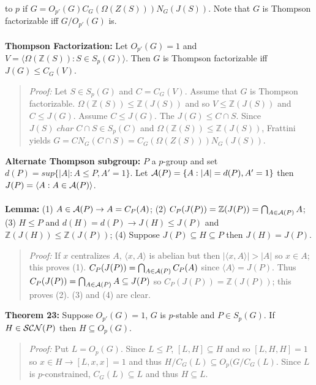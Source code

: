 to $p$ if $G=O_{p'}(G) C_G( \Omega(Z(S))) N_G(J(S))$.  
Note that $G$ is Thompson factorizable iff $G/O_{p'}(G)$ is.
\\
\\
{\bf Thompson Factorization:} 
Let $O_{p'}(G)=1$ and $V= \langle \Omega({\mathbb Z}(S)): S \in S_p(G) \rangle $.
Then $G$ is Thompson factorizable iff $J(G) \le C_G(V)$.
\begin{quote}
\emph{Proof:}  
Let $S \in S_p(G)$ and $C= C_G(V)$.  Assume that $G$ is Thompson factorizable.
$\Omega({\mathbb Z}(S)) \le {\mathbb Z}(J(S))$ and so $V \le {\mathbb Z}(J(S))$ and
$C \le J(G)$.
Assume $C \le J(G)$.  The $J(G) \le C \cap S$.  Since $J(S) \; char \; C \cap S \in S_p(C)$
and
$\Omega({\mathbb Z}(S)) \le {\mathbb Z}(J(S))$, Frattini yields
$G= C N_G(C \cap S) =
C_G( \Omega(Z(S))) N_G(J(S))$.
\end{quote}
{\bf Alternate Thompson subgroup:} 
$P$ a $p$-group and set $d(P)= sup\{ |A| : A \le P, A'=1 \}$.  Let
${\cal A}(P)= \{ A: |A|=d(P), A'=1 \}$ then $J(P)= \langle A : A \in {\cal A}(P) \rangle $.
\\
\\
{\bf Lemma:}
(1) $A \in {\cal A}(P) \rightarrow A=C_P(A)$;
(2) $C_P(J(P))= {\mathbb Z}(J(P)) = \bigcap_{A \in {\cal A}(P)} A$;
(3) $H \le P$ and $d(H)=d(P) \rightarrow J(H) \le J(P)$ and
${\mathbb Z}(J(H)) \le {\mathbb Z}(J(P))$;
(4) Suppose $J(P) \subseteq H \subseteq P$ then $J(H)=J(P)$.
\begin{quote}
\emph{Proof:}
If $x$ centralizes $A$, $ \langle x, A \rangle $ is abelian but then 
$| \langle x,A \rangle | > |A|$ so $x \in A$; this proves
(1).  $C_P(J(P))= \bigcap_{A \in {\cal A}(P)} C_P(A)$ since $ \langle A \rangle =J(P)$.  Thus
$C_P(J(P)) = \bigcap_{A \in {\cal A}(P)} A \subseteq J(P)$ so
$C_P(J(P))= {\mathbb Z}(J(P))$; this proves (2).  (3) and (4) are clear.
\end{quote}
{\bf Theorem 23:}
Suppose $O_{p'}(G)=1$, $G$ is $p$-stable and $P \in S_p(G)$.  If $H \in {\cal SCN}(P)$ then
$H \subseteq O_p(G)$.
\begin{quote}
\emph{Proof:}
Put $L=O_p(G)$.  Since $L \le P$, $[L, H] \subseteq H$ and so $[L, H, H]=1$ so
$x \in H \rightarrow [L,x,x]=1$ and thus $H/C_G(L) \subseteq O_p(G/C_G(L)$.  Since
$L$ is $p$-constrained, $C_G(L) \subseteq L$ and thus $H \subseteq L$.
\end{quote}
